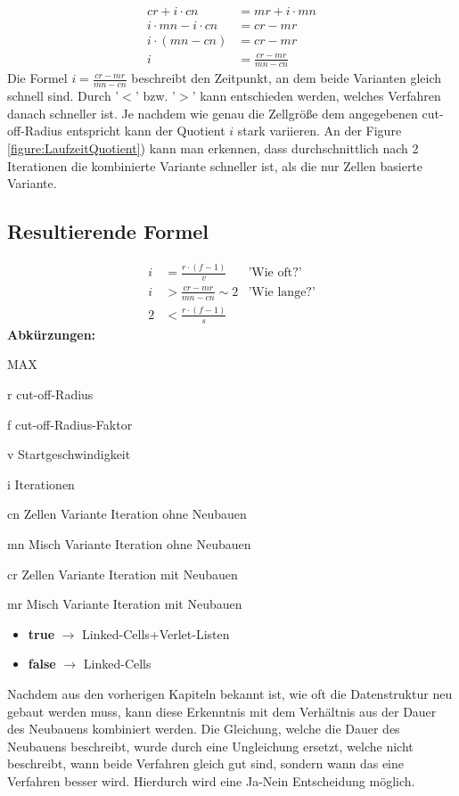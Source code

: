 \documentclass[
12pt,
a4paper,
BCOR10mm,
DIV14,
headsepline,
]{scrreprt}
\begin{document}
	\begin{align*}
	cr+i\cdot cn&=mr+i\cdot mn\\
	i\cdot mn-i\cdot cn&=cr-mr\\
	i\cdot (mn-cn)&=cr-mr\\
	i&=\frac{cr-mr}{mn-cn}
	\end{align*}
	Die Formel $i=\frac{cr-mr}{mn-cn}$ beschreibt den Zeitpunkt, an dem beide Varianten gleich schnell sind. Durch '$<$' bzw. '$>$' kann entschieden werden, welches Verfahren danach schneller ist. Je nachdem wie genau die Zellgröße dem angegebenen cut-off-Radius entspricht kann der Quotient $i$ stark variieren. An der Figure \ref{figure:LaufzeitQuotient}) kann man erkennen, dass durchschnittlich nach 2 Iterationen die kombinierte Variante schneller ist, als die nur Zellen basierte Variante.
	\subsection{Resultierende Formel}%
	\begin{align*}
	i&=\frac{r \cdot (f - 1)}{v} &\text{'Wie oft?'}\\
	i&>\frac{cr-mr}{mn-cn}\sim 2&\text{'Wie lange?'}\\
	2&<\frac{r \cdot (f - 1)}{s}
	\end{align*}
	\footnotesize\textbf{Abkürzungen:}\begin{labeling}[~--]{MAX}
		\item[r] cut-off-Radius
		\item[f] cut-off-Radius-Faktor
		\item[v] Startgeschwindigkeit
		\item[i] Iterationen
		\item[cn] Zellen Variante Iteration ohne Neubauen
		\item[mn] Misch Variante Iteration ohne Neubauen
		\item[cr] Zellen Variante Iteration mit Neubauen
		\item[mr] Misch Variante Iteration mit Neubauen
	\end{labeling}
	
	\begin{itemize}
		\item \textbf{true} $\rightarrow$ Linked-Cells+Verlet-Listen
		\item \textbf{false} $\rightarrow$ Linked-Cells
	\end{itemize}
	Nachdem aus den vorherigen Kapiteln bekannt ist, wie oft die Datenstruktur neu gebaut werden muss, kann diese Erkenntnis mit dem Verhältnis aus der Dauer des Neubauens kombiniert werden. Die Gleichung, welche die Dauer des Neubauens beschreibt, wurde durch eine Ungleichung ersetzt, welche nicht beschreibt, wann beide Verfahren gleich gut sind, sondern wann das eine Verfahren besser wird. Hierdurch wird eine Ja-Nein Entscheidung möglich.
	
\end{document}
